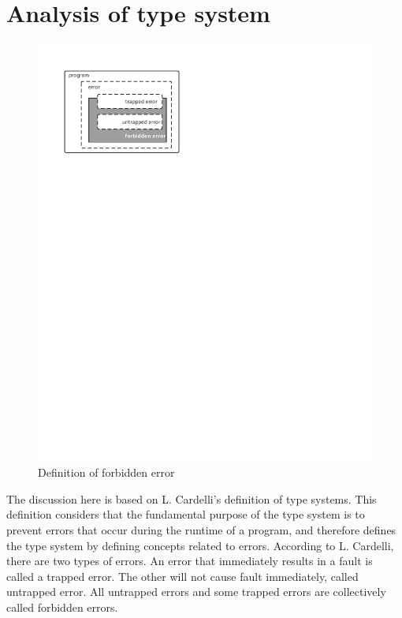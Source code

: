 \section{Analysis of type system}

\begin{figure}[htbp]
    \centerline{\includegraphics[scale=0.8]{figures/type-definition}}
    \caption{Definition of forbidden error}
    \label{fig:type-definition}
\end{figure}

The discussion here is based on L. Cardelli's definition of type systems.
This definition considers that the fundamental purpose of
the type system is to prevent errors that occur during the
runtime of a program, and therefore defines the type system by defining
concepts related to errors.
According to L. Cardelli, there are two types of errors. An error that immediately results in a fault is called a trapped error. The other will not cause fault immediately, called untrapped error. All untrapped errors and some trapped errors are collectively called forbidden errors.

